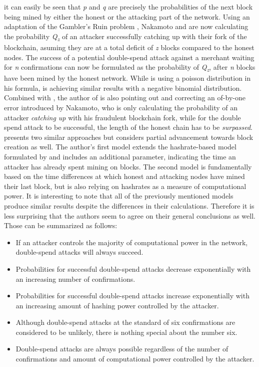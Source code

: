 \documentclass[a4paper,12pt,twoside]{report}
\begin{document}
it can easily be seen that \textit{p} and \textit{q} are precisely the probabilities of the next block being mined by either the honest or the attacking part of the network. Using an adaptation of the Gambler's Ruin problem \cite{gamblersruin}, Nakamoto and \cite{HBDSA} are now calculating the probability \textit{Q\textsubscript{z}} of an attacker successfully catching up with their fork of the blockchain, asuming they are at a total deficit of \textit{z} blocks compared to the honest nodes. The success of a potential double-spend attack against a merchant waiting for \textit{n} confirmations can now be formulated as the probability of \textit{Q\textsubscript{z}}, after \textit{n} blocks have been mined by the honest network. While \cite{nakamoto2008bitcoin} is using a poisson distribution in his formula, \cite{HBDSA} is achieving similar results with a negative binomial distribution. Combined with \cite{NakamotoDSACorrection}, the author of \cite{HBDSA} is also pointing out and correcting an of-by-one error introduced by Nakamoto, who is only calculating the probability of an attacker \textit{catching up} with his fraudulent blockchain fork, while for the double spend attack to be successful, the length of the honest chain has to be \textit{surpassed}. \cite{DSAwithTime} presents two similar approaches but considers partial advancement towards block creation as well. The author's first model extends the hashrate-based model formulated by \cite{HBDSA} and includes an additional parameter, indicating the time an attacker has already spent mining on blocks. The second model is fundamentally based on the time differences at which honest and attacking nodes have mined their last block, but is also relying on hashrates as a measure of computational power.
It is interesting to note that all of the previously mentioned models produce similar results despite the differences in their calculations. Therefore it is less surprising that the authors seem to agree on their general conclusions as well. Those can be summarized as follows:
\begin{itemize}
\item If an attacker controls the majority of computational power in the network, double-spend attacks will always succeed.
\item Probabilities for successful double-spend attacks decrease exponentially with an increasing number of confirmations.
\item Probabilities for successful double-spend attacks increase exponentially with an increasing amount of hashing power controlled by the attacker.
\item Although double-spend attacks at the standard of six confirmations are considered to be unlikely, there is nothing special about the number six.
\item Double-spend attacks are always possible regardless of the number of confirmations and amount of computational power controlled by the attacker.
\end{itemize}
\end{document}

